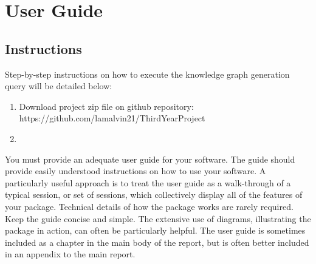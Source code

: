 \chapter{User Guide}
\section{Instructions}
Step-by-step instructions on how to execute the knowledge graph generation query will be detailed below:

\begin{enumerate}
    \item Download project zip file on github repository: https://github.com/lamalvin21/ThirdYearProject
    \item 
\end{enumerate}

You must provide an adequate user guide for your software. The guide should provide easily understood instructions on how to use your software. A particularly useful approach is to treat the user guide as a walk-through of a typical session, or set of sessions, which collectively display all of the features of your package. Technical details of how the package works are rarely required. Keep the guide concise and simple. The extensive use of diagrams, illustrating the package in action, can often be particularly helpful. The user guide is sometimes included as a chapter in the main body of the report, but is often better included in an appendix to the main report.
